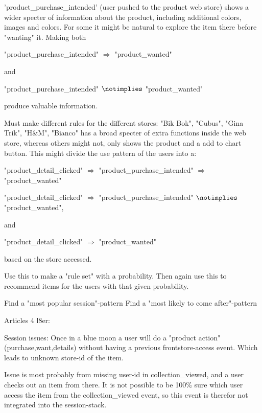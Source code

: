 'product\_purchase\_intended' (user pushed to the product web store) shows a
wider specter of information about the product, including additional colors,
images and colors.  For some it might be natural to explore the item there
before "wanting" it. Making both

"product\_purchase\_intended" $\Rightarrow$ "product\_wanted"

and

"product\_purchase\_intended" $\notimplies$ "product\_wanted"

produce valuable information.

Must make different rules for the different stores:
"Bik Bok", "Cubus", "Gina Trik", "H\&M", "Bianco" has a broad specter of extra
functions inside the web store, whereas others might not, only shows the
product and a add to chart button.  This might divide the use pattern of the
users into a:

"product\_detail\_clicked" $\Rightarrow$ "product\_purchase\_intended" $\Rightarrow$ "product\_wanted"

"product\_detail\_clicked" $\Rightarrow$ "product\_purchase\_intended" $\notimplies$ "product\_wanted",

and

"product\_detail\_clicked" $\Rightarrow$ "product\_wanted"

based on the store accessed.

Use this to make a "rule set" with a probability.
Then again use this to recommend items for the users with that given
probability.

Find a "most popular session"-pattern
Find a "most likely to come after"-pattern


Articles 4 l8er:

Session issues:
Once in a blue moon a user will do a "product action" (purchase,want,details)
without having a previous frontstore-access event. Which leads to unknown
store-id of the item.

Issue is most probably from missing user-id in collection\_viewed, and a user
checks out an item from there. It is not possible to be 100\% sure which user
access the item from the collection\_viewed event, so this event is therefor
not integrated into the session-stack.



